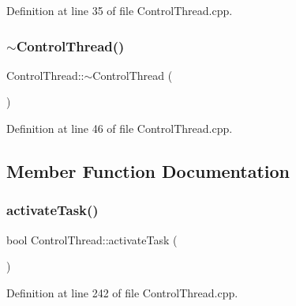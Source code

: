 Definition at line 35 of file Control\+Thread.\+cpp.

\hypertarget{classocra__recipes_1_1ControlThread_ae1dbbb5ec386b01a88e10ad37f3675bd}{}\label{classocra__recipes_1_1ControlThread_ae1dbbb5ec386b01a88e10ad37f3675bd} 
\subsubsection{\texorpdfstring{$\sim$\+Control\+Thread()}{~ControlThread()}}
{\footnotesize\ttfamily Control\+Thread\+::$\sim$\+Control\+Thread (\begin{DoxyParamCaption}{ }\end{DoxyParamCaption})}



Definition at line 46 of file Control\+Thread.\+cpp.



\subsection{Member Function Documentation}
\hypertarget{classocra__recipes_1_1ControlThread_a68b22022240de911c5131b642a9eff1a}{}\label{classocra__recipes_1_1ControlThread_a68b22022240de911c5131b642a9eff1a} 
\subsubsection{\texorpdfstring{activate\+Task()}{activateTask()}}
{\footnotesize\ttfamily bool Control\+Thread\+::activate\+Task (\begin{DoxyParamCaption}{ }\end{DoxyParamCaption})}



Definition at line 242 of file Control\+Thread.\+cpp.

\hypertarget{classocra__recipes_1_1ControlThread_a12bc9c3976f83aaf281f31d225740bd2}{}\label{classocra__recipes_1_1ControlThread_a12bc9c3976f83aaf281f31d225740bd2} 
